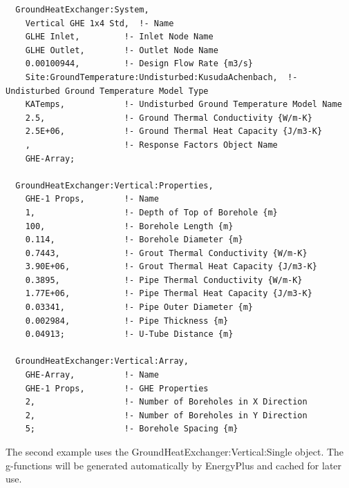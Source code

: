 \begin{lstlisting}
  GroundHeatExchanger:System,
    Vertical GHE 1x4 Std,  !- Name
    GLHE Inlet,         !- Inlet Node Name
    GLHE Outlet,        !- Outlet Node Name
    0.00100944,         !- Design Flow Rate {m3/s}
    Site:GroundTemperature:Undisturbed:KusudaAchenbach,  !- Undisturbed Ground Temperature Model Type
    KATemps,            !- Undisturbed Ground Temperature Model Name
    2.5,                !- Ground Thermal Conductivity {W/m-K}
    2.5E+06,            !- Ground Thermal Heat Capacity {J/m3-K}
    ,                   !- Response Factors Object Name
    GHE-Array;

  GroundHeatExchanger:Vertical:Properties,
    GHE-1 Props,        !- Name
    1,                  !- Depth of Top of Borehole {m}
    100,                !- Borehole Length {m}
    0.114,              !- Borehole Diameter {m}
    0.7443,             !- Grout Thermal Conductivity {W/m-K}
    3.90E+06,           !- Grout Thermal Heat Capacity {J/m3-K}
    0.3895,             !- Pipe Thermal Conductivity {W/m-K}
    1.77E+06,           !- Pipe Thermal Heat Capacity {J/m3-K}
    0.03341,            !- Pipe Outer Diameter {m}
    0.002984,           !- Pipe Thickness {m}
    0.04913;            !- U-Tube Distance {m}

  GroundHeatExchanger:Vertical:Array,
    GHE-Array,          !- Name
    GHE-1 Props,        !- GHE Properties
    2,                  !- Number of Boreholes in X Direction
    2,                  !- Number of Boreholes in Y Direction
    5;                  !- Borehole Spacing {m}
\end{lstlisting}

The second example uses the GroundHeatExchanger:Vertical:Single object. The g-functions will be generated automatically by EnergyPlus and cached for later use.


